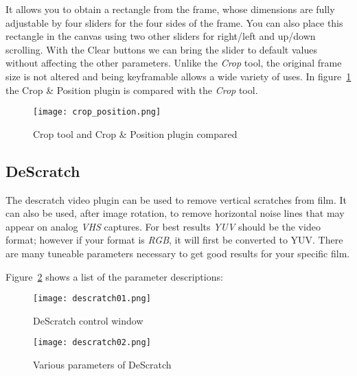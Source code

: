 It allows you to obtain a rectangle from the frame, whose dimensions are fully adjustable by four sliders for the four sides of the frame. You can also place this rectangle in the canvas using two other sliders for right/left and up/down scrolling. With the Clear buttons we can bring the slider to default values without affecting the other parameters. Unlike the \textit{Crop} tool, the original frame size is not altered and being keyframable allows a wide variety of uses. In figure~\ref{fig:crop_position} the Crop \& Position plugin is compared with the \textit{Crop} tool.

\begin{figure}[htpb]
	\centering
	\texttt{[image: crop\_position.png]}
	\caption{Crop tool and Crop \& Position plugin compared}
	\label{fig:crop_position}
\end{figure}

\subsection{DeScratch}%
\label{sub:descratch}

The descratch video plugin can be used to remove vertical scratches
from film. It can also be used, after image rotation, to remove
horizontal noise lines that may appear on analog \textit{VHS}
captures. For best results \textit{YUV} should be the video format;
however if your format is \textit{RGB}, it will first be converted
to YUV\@. There are many tuneable parameters necessary to get good
results for your specific film.

Figure~\ref{fig:descratch01} shows a list of the parameter descriptions:

\begin{figure}[htpb]
    \centering
    \texttt{[image: descratch01.png]}
    \caption{DeScratch control window}
    \label{fig:descratch01}
\end{figure}

\begin{figure}[htpb]
    \centering
    \texttt{[image: descratch02.png]}
    \caption{Various parameters of DeScratch}
    \label{fig:descratch02}
\end{figure}

